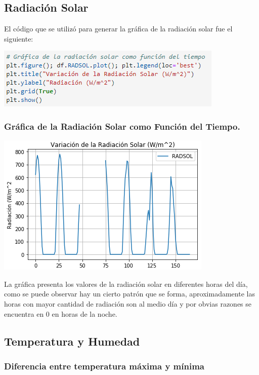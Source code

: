 \documentclass{article}
\begin{document}
\subsection{Radiación Solar}
El código que se utilizó para generar la gráfica de la radiación solar fue el siguiente:
\begin{center}
    \includegraphics[scale = 1]{Rad.png}
\end{center}
\subsubsection{Gráfica de la Radiación Solar como Función del Tiempo.}

\begin{center}
    \includegraphics[scale=1]{GRad.png}
\end{center}

La gráfica presenta los valores de la radiación solar en diferentes horas del día, como se puede observar hay un cierto patrón que se forma, aproximadamente las horas con mayor cantidad de radiación son al medio día y por obvias razones se encuentra en 0 en horas de la noche.

\subsection{Temperatura y Humedad}

\subsubsection{Diferencia entre temperatura máxima y mínima}
\end{document}
